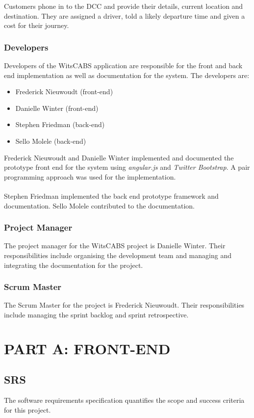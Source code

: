 \documentclass[12pt]{article}
\begin{document}
Customers phone in to the DCC and provide their details, current location and destination. They are assigned a driver, told a likely departure time and given a cost for their journey.

\subsubsection{Developers}
Developers of the WitsCABS application are responsible for the front and back end implementation as well as documentation for the system. The developers are:
\begin{itemize}
\item Frederick Nieuwoudt (front-end)
\item Danielle Winter (front-end)
\item Stephen Friedman (back-end)
\item Sello Molele (back-end)
\end{itemize} 
Frederick Nieuwoudt and Danielle Winter implemented and documented the prototype front end for the system using \textit{angular.js} and \textit{Twitter Bootstrap}. A pair programming approach was used for the implementation.\\\\
Stephen Friedman implemented the back end prototype framework and documentation. Sello Molele contributed to the documentation.
\subsubsection{Project Manager}
The project manager for the WitsCABS project is Danielle Winter. Their responsibilities include organising the development team and managing and integrating the documentation for the project. 
\subsubsection{Scrum Master}
The Scrum Master for the project is Frederick Nieuwoudt. Their responsibilities include managing the sprint backlog and sprint retrospective.   

\newpage
\section{PART A: FRONT-END}
\subsection{SRS}
The software requirements specification quantifies the scope and success criteria for this project. \\ 
\end{document}
